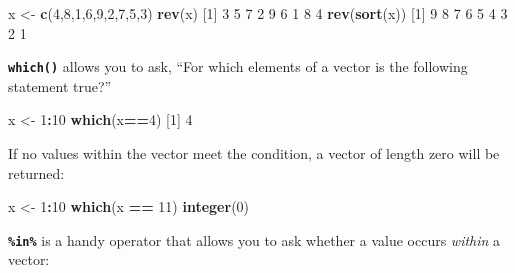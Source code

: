 \documentclass[
]{book}
\newenvironment{Shaded}{\begin{snugshade}}{\end{snugshade}}
\newcommand{\DecValTok}[1]{\textcolor[rgb]{0.00,0.00,0.81}{#1}}
\newcommand{\KeywordTok}[1]{\textcolor[rgb]{0.13,0.29,0.53}{\textbf{#1}}}
\newcommand{\NormalTok}[1]{#1}
\newcommand{\OperatorTok}[1]{\textcolor[rgb]{0.81,0.36,0.00}{\textbf{#1}}}
\newcommand{\OtherTok}[1]{\textcolor[rgb]{0.56,0.35,0.01}{#1}}
\newcommand{\StringTok}[1]{\textcolor[rgb]{0.31,0.60,0.02}{#1}}
\begin{document}
\begin{Shaded}
\begin{Highlighting}[]
\NormalTok{x <-}\StringTok{ }\KeywordTok{c}\NormalTok{(}\DecValTok{4}\NormalTok{,}\DecValTok{8}\NormalTok{,}\DecValTok{1}\NormalTok{,}\DecValTok{6}\NormalTok{,}\DecValTok{9}\NormalTok{,}\DecValTok{2}\NormalTok{,}\DecValTok{7}\NormalTok{,}\DecValTok{5}\NormalTok{,}\DecValTok{3}\NormalTok{)}
\KeywordTok{rev}\NormalTok{(x)}
\NormalTok{[}\DecValTok{1}\NormalTok{] }\DecValTok{3} \DecValTok{5} \DecValTok{7} \DecValTok{2} \DecValTok{9} \DecValTok{6} \DecValTok{1} \DecValTok{8} \DecValTok{4}
\KeywordTok{rev}\NormalTok{(}\KeywordTok{sort}\NormalTok{(x))}
\NormalTok{[}\DecValTok{1}\NormalTok{] }\DecValTok{9} \DecValTok{8} \DecValTok{7} \DecValTok{6} \DecValTok{5} \DecValTok{4} \DecValTok{3} \DecValTok{2} \DecValTok{1}
\end{Highlighting}
\end{Shaded}

\textbf{\texttt{which()}} allows you to ask, ``For which elements of a vector is the following statement true?''

\begin{Shaded}
\begin{Highlighting}[]
\NormalTok{x <-}\StringTok{ }\DecValTok{1}\OperatorTok{:}\DecValTok{10}
\KeywordTok{which}\NormalTok{(x}\OperatorTok{==}\DecValTok{4}\NormalTok{)}
\NormalTok{[}\DecValTok{1}\NormalTok{] }\DecValTok{4}
\end{Highlighting}
\end{Shaded}

If no values within the vector meet the condition, a vector of length zero will be returned:

\begin{Shaded}
\begin{Highlighting}[]
\NormalTok{x <-}\StringTok{ }\DecValTok{1}\OperatorTok{:}\DecValTok{10}
\KeywordTok{which}\NormalTok{(x }\OperatorTok{==}\StringTok{ }\DecValTok{11}\NormalTok{)}
\KeywordTok{integer}\NormalTok{(}\DecValTok{0}\NormalTok{)}
\end{Highlighting}
\end{Shaded}

\textbf{\texttt{\%in\%}} is a handy operator that allows you to ask whether a value occurs \emph{within} a vector:

\begin{Shaded}
\end{Shaded}
\end{document}
